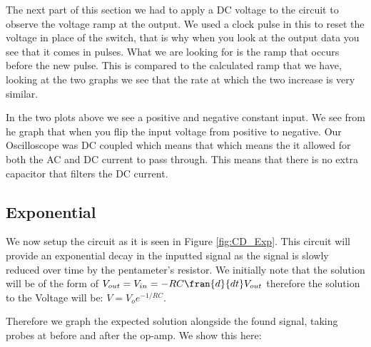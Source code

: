 The next part of this section we had to apply a DC voltage to the circuit to observe the voltage ramp at the output. We used a clock pulse in this to reset the voltage in place of the switch, that is why when you look at the output data you see that it comes in pulses. What we are looking for is the ramp that occurs before the new pulse. This is compared to the calculated ramp that we have, looking at the two graphs we see that the rate at which the two increase is very similar. 

In the two plots above we see a positive and negative constant input. We see from he graph that when you flip the input voltage from positive to negative. Our Oscilloscope was DC coupled which means that which means the it allowed for both the AC and DC current to pass through. This means that there is no extra capacitor that filters the DC current. 

\newpage

\subsection{Exponential} \label{sec:Exp}

We now setup the circuit as it is seen in Figure \ref{fig:CD_Exp}. This circuit will provide an exponential decay in the inputted signal as the signal is slowly reduced over time by the pentameter's resistor. We initially note that the solution will be of the form of $V_{out} = V_{in} = -RC \fran{d}{dt}V_{out}$ therefore the solution to the Voltage will be: $V = V_o e^{-1/RC}$. \newline

Therefore we graph the expected solution alongside the found signal, taking probes at before and after the op-amp. We show this here:

